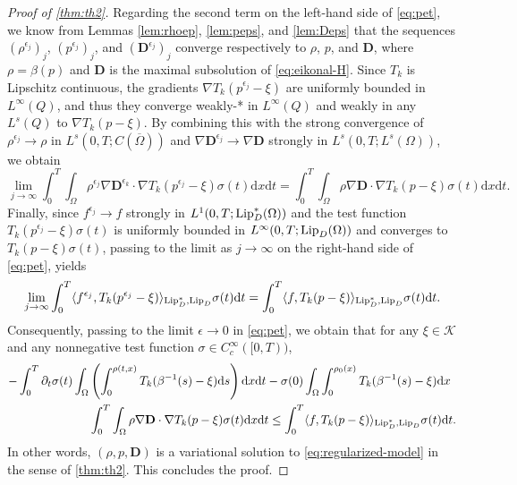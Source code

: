 \documentclass[final,reqno]{amsart}
\theoremstyle{plain}
\theoremstyle{definition}
\theoremstyle{remark}
\numberwithin{remark}{section}	%
\numberwithin{example}{section}	%
\newcommand{\de}{\mathbf{D}}
\newcommand{\K}{\mathcal K}
\newcommand{\Om}{\Omega}
\newcommand{\Lip}{\textup{Lip}}
\newcommand{\dd}{\mathrm{d}}
\begin{document}
\begin{proof}[Proof of \cref{thm:th2}]
    Regarding the second term on the left-hand side of \eqref{eq:pet}, we know from Lemmas \ref{lem:rhoep}, \ref{lem:peps}, and \ref{lem:Deps} that the sequences $(\rho^{\epsilon_j})_{j}$, $(p^{\epsilon_j})_{j}$, and $(\de^{\epsilon_j})_{j}$ converge respectively to $\rho$, $p$, and $\de$, where $\rho=\beta(p)$ and $\de$ is the maximal subsolution of \eqref{eq:eikonal-H}. Since $T_k$ is Lipschitz continuous, the gradients $\nabla T_k(p^{\epsilon_j} -\xi)$ are uniformly bounded in $L^\infty(Q)$, and thus they converge weakly-* in $L^\infty(Q)$ and weakly in any $L^s(Q)$ to $\nabla T_k(p-\xi)$. By combining this with the strong convergence of $\rho^{\epsilon_j} \to \rho$ in $L^s(0,T; C(\overline{\Omega}))$ and $\nabla \de^{\epsilon_j} \to \nabla \de$ strongly in $L^s(0,T; L^s(\Omega))$, we obtain
    \begin{equation*}
        \lim_{j \to \infty} \int_{0}^{T}\int_{\Omega} \rho^{\epsilon_j} \nabla \de^{\epsilon_k} \cdot \nabla T_k(p^{\epsilon_j}-\xi)\sigma(t) \dd x \dd t = \int_{0}^{T}\int_{\Omega} \rho \nabla \de \cdot \nabla T_k(p-\xi)\sigma(t) \dd x \dd t. 
    \end{equation*}
    Finally, since $f^{\epsilon_j} \to f$ strongly in $L^1(0,T; \Lip_D^*(\Om))$ and the test function $T_k(p^{\epsilon_j}-\xi)\sigma(t)$ is uniformly bounded in $L^\infty(0,T; \Lip_D(\Omega))$ and converges to $T_k(p-\xi)\sigma(t)$, passing to the limit as $j\to\infty$ on the right-hand side of \eqref{eq:pet}, yields
    \begin{equation*}
        \lim_{j \to \infty} \int_{0}^{T} \langle f^{\epsilon_j}, T_k(p^{\epsilon_j}-\xi) \rangle_{\Lip_D^*, \Lip_D} \sigma(t) \dd t = \int_{0}^{T} \langle f, T_k(p-\xi) \rangle_{\Lip_D^*, \Lip_D} \sigma(t) \dd t.
    \end{equation*}
   Consequently, passing to the limit $\epsilon \to0$ in \eqref{eq:pet}, we obtain that for any $\xi \in \K$ and any nonnegative test function $\sigma \in C^{\infty}_{c}([0,T))$, 
    \begin{equation}
        \begin{aligned}
        -\int_{0}^{T}\partial_t \sigma(t) \int_{\Omega} &\left( \int_{0}^{\rho(t,x)} T_k(\beta^{-1}(s)-\xi) \dd s \right) \dd x \dd t  -\sigma(0) \int_{\Om}\int_{0}^{\rho_{0}(x)} T_{k}(\beta^{-1}(s) -\xi)\dd x \\
        & \int_{0}^{T}\int_{\Omega} \rho \nabla \de \cdot \nabla T_k(p-\xi)\sigma(t) \dd x \dd t \le \int_{0}^{T} \langle f, T_k(p-\xi) \rangle_{\Lip_D^*, \Lip_D} \sigma(t) \dd t.
        \end{aligned}
    \end{equation}
   In other words, $(\rho, p, \de)$ is a variational solution to \eqref{eq:regularized-model} in the sense of \cref{thm:th2}. This concludes the proof.
\end{proof}
			
\end{document}
